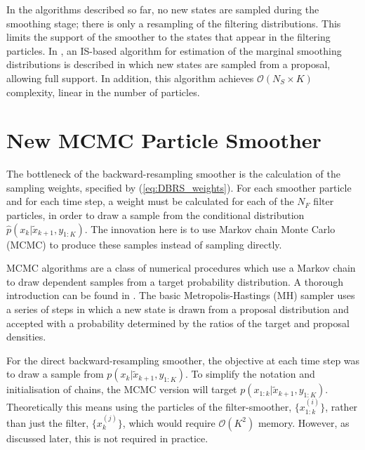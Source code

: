 \documentclass[journal]{IEEEtran}
\begin{document}
In the algorithms described so far, no new states are sampled during the smoothing stage; there is only a resampling of the filtering distributions. This limits the support of the smoother to the states that appear in the filtering particles. In \cite{Fearnhead2010}, an IS-based algorithm for estimation of the marginal smoothing distributions is described in which new states are sampled from a proposal, allowing full support. In addition, this algorithm achieves $\mathcal{O}( N_S \times K)$ complexity, linear in the number of particles.




\section{New MCMC Particle Smoother} \label{sec:mcmc_smoother}

The bottleneck of the backward-resampling smoother is the calculation of the sampling weights, specified by (\ref{eq:DBRS_weights}). For each smoother particle and for each time step, a weight must be calculated for each of the $N_F$ filter particles, in order to draw a sample from the conditional distribution $\hat{p}(x_k|\tilde{x}_{k+1}, y_{1:K})$. The innovation here is to use Markov chain Monte Carlo (MCMC) to produce these samples instead of sampling directly.

MCMC algorithms are a class of numerical procedures which use a Markov chain to draw dependent samples from a target probability distribution. A thorough introduction can be found in \cite{Gilks1996}. The basic Metropolis-Hastings (MH) \cite{Hastings1970} sampler uses a series of steps in which a new state is drawn from a proposal distribution and accepted with a probability determined by the ratios of the target and proposal densities.

For the direct backward-resampling smoother, the objective at each time step was to draw a sample from $p(x_{k}|\tilde{x}_{k+1}, y_{1:K})$. To simplify the notation and initialisation of chains, the MCMC version will target $p(x_{1:k}|\tilde{x}_{k+1}, y_{1:K})$. Theoretically this means using the particles of the filter-smoother, $\{x_{1:k}^{(i)}\}$, rather than just the filter, $\{x_k^{(j)}\}$, which would require $\mathcal{O}(K^2)$ memory. However, as discussed later, this is not required in practice.
\end{document}
